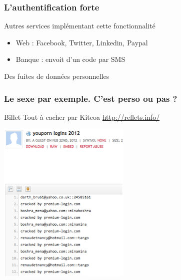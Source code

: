 \documentclass{beamer}
\begin{document}
\begin{frame}
\frametitle{L'authentification forte}
\begin{block}{Autres services implémentant cette fonctionnalité}
\begin{itemize}
\item Web : Facebook, Twitter, Linkedin, Paypal
\item Banque : envoit d'un code par SMS
\end{itemize}
\end{block}
\end{frame}

\begin{frame}
\Huge{\centerline{Des fuites de données personnelles}}
\end{frame}
\begin{frame}
\frametitle{Le sexe par exemple. C’est perso ou pas ?}

\begin{block}{Billet Tout à cacher par Kiteoa \url{http://reflets.info/}}
\begin{itemize}
\end{itemize}
\end{block}
\begin{center}
\includegraphics[scale=1]{./images/youporn.png}
\end{center}
\end{frame}
\end{document}
